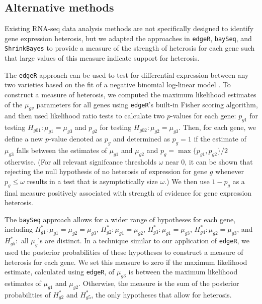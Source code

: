 \documentclass[useAMS,usenatbib,referee]{biom}
\begin{document}
\subsection{Alternative methods}
\label{s:alternative}

Existing RNA-seq data analysis methods are not specifically designed to identify gene expression heterosis, but we adapted the approaches in {\tt edgeR}, {\tt baySeq}, and {\tt ShrinkBayes} to provide a measure of the strength of heterosis for each gene such that large values of this measure indicate support for heterosis.

The {\tt edgeR} approach can be used to test for differential expression between any two varieties based on the fit of a negative binomial log-linear model \citep{robinson2007moderated, robinson2010edgeR}. To construct a measure of heterosis, we computed the maximum likelihood estimates of the $\mu_{gv}$ parameters for all genes using {\tt edgeR}'s built-in Fisher scoring algorithm, and then used likelihood ratio tests to calculate two $p$-values for each gene: $p_{g1}$  for testing $H_{g01}:\mu_{g1}=\mu_{g3}$ and $p_{g2}$ for testing $H_{g02}:\mu_{g2}=\mu_{g3}$. Then, for each gene, we define a new $p$-value denoted as $p_g$ and determined as $p_g=1$ if the estimate of $\mu_{g3}$ falls between the estimates of $\mu_{g1}$ and $\mu_{g2}$ and $p_g=\max\{p_{g1},p_{g2}\}/2$ otherwise.  (For all relevant signifcance thresholds $\omega$ near 0, it can be shown that rejecting the null hypothesis of no heterosis of expression for gene $g$ whenever $p_g\leq \omega$ results in a test that is asymptotically size $\omega$.)  We then use $1-p_g$ as a final measure positively associated with strength of evidence for gene expression heterosis. 

The {\tt baySeq} approach allows for a wider range of hypotheses for each gene, including $H^*_{g1}: \mu_{g1}=\mu_{g2}=\mu_{g3}$, $H^*_{g 2}: \mu_{g1}=\mu_{g2}$, $H^*_{g 3}: \mu_{g1}=\mu_{g3}$, $H^*_{g 4}: \mu_{g2}=\mu_{g3}$, and $H^*_{g 5}:$ all $\mu_g$'s are distinct. In a technique similar to our application of {\tt edgeR}, we used the posterior probabilities of these hypotheses to construct a measure of heterosis for each gene. We set this measure to zero if the maximum likelihood estimate, calculated using {\tt edgeR}, of $\mu_{g3}$ is between the maximum likelihood estimates of $\mu_{g1}$ and $\mu_{g2}$. Otherwise, the measure is the sum of the posterior probabilities of $H^*_{g 2}$ and $H^*_{g 5}$, the only hypotheses that allow for heterosis.
\end{document}
